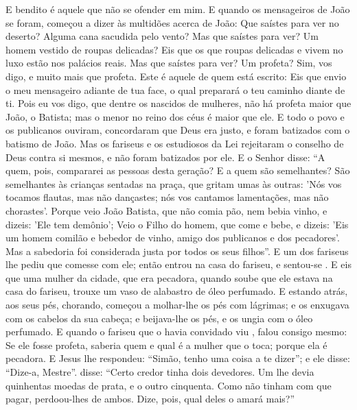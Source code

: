 {  E bendito
 é aquele que não se ofender em mim.
  E quando os mensageiros de João se foram,
{} começou a dizer às multidões acerca de João: Que saístes para ver no deserto? Alguma cana sacudida pelo vento?
  Mas que saístes para ver? Um homem vestido de roupas delicadas? Eis que os que
{} roupas delicadas e vivem no luxo estão nos palácios reais.
  Mas que saístes para ver? Um profeta? Sim, vos digo, e muito mais que profeta.
  Este é aquele de quem está escrito: Eis que envio o meu mensageiro adiante de tua face, o qual preparará o teu caminho diante de ti.
  Pois eu vos digo, que dentre os nascidos de mulheres, não há profeta maior que João, o Batista; mas o menor no reino dos céus é maior que ele.
  E todo o povo e os publicanos ouviram, concordaram que Deus era justo, e foram batizados com o batismo de João.
  Mas os fariseus e os estudiosos da Lei rejeitaram o conselho de Deus contra si mesmos, e não foram batizados por ele.
  E o Senhor disse: “A quem, pois, compararei as pessoas desta geração? E a quem são semelhantes?
  São semelhantes às crianças sentadas na praça, que gritam umas às outras: 'Nós vos tocamos flautas, mas não dançastes; nós vos cantamos lamentações, mas não chorastes'.
  Porque veio João Batista, que não comia pão, nem bebia vinho, e dizeis: 'Ele tem demônio';
  Veio o Filho do homem, que come e bebe, e dizeis: 'Eis um homem comilão e bebedor de vinho, amigo dos publicanos e dos pecadores'.
  Mas a sabedoria foi considerada justa por todos os seus filhos”.
  E um dos fariseus lhe pediu que comesse com ele; então entrou na casa do fariseu, e sentou-se
{} .
  E eis que uma mulher da cidade, que era pecadora, quando soube que ele estava na casa do fariseu, trouxe um vaso de alabastro de óleo perfumado.
  E estando atrás, aos seus pés, chorando, começou a molhar-lhe os pés com lágrimas; e os enxugava com os cabelos da sua cabeça; e beijava-lhe os pés, e os ungia com o óleo perfumado.
  E quando o fariseu que o havia convidado viu
{},  falou consigo mesmo: Se ele fosse profeta, saberia quem e qual é a mulher que o toca; porque ela é pecadora.
  E Jesus lhe respondeu: “Simão, tenho uma coisa a te dizer”; e ele disse: “Dize-a, Mestre”.
   disse: “Certo credor tinha dois devedores. Um lhe devia quinhentas moedas de prata, e o outro cinquenta.
  Como não tinham com que pagar, perdoou-lhes
{} de ambos. Dize, pois, qual deles o amará mais?”
}
